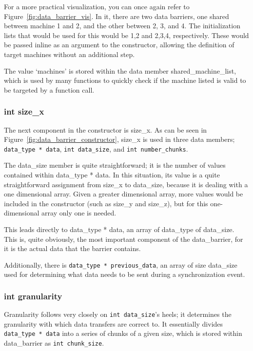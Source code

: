\documentclass[../thesis.tex]{subfiles}
\begin{document}
    For a more practical visualization, you can once again refer to Figure~\ref{fig:data_barrier_vis}. In it, there are two data barriers, one shared between machine 1 and 2, and the other between 2, 3, and 4. The initialization lists that would be used for this would be {1,2} and {2,3,4}, respectively. These would be passed inline as an argument to the constructor, allowing the definition of target machines without an additional step.

    The value `machines' is stored within the data member shared\_machine\_list, which is used by many functions to quickly check if the machine listed is valid to be targeted by a function call.

  \subsubsection{int size\_x} %
  \label{ssub:int_size_x}
      The next component in the constructor is size\_x. As can be seen in Figure~\ref{fig:data_barrier_constructor}, size\_x is used in three data members; \texttt{data\_type * data}, \texttt{int data\_size}, and \texttt{int number\_chunks}.

      The data\_size member is quite straightforward; it is the number of values contained within data\_type * data. In this situation, its value is a quite straightforward assignment from size\_x to data\_size, because it is dealing with a one dimensional array. Given a greater dimensional array, more values would be included in the constructor (such as size\_y and size\_z), but for this one-dimensional array only one is needed.

      This leads directly to data\_type * data, an array of data\_type of data\_size. This is, quite obviously, the most important component of the data\_barrier, for it is the actual data that the barrier contains.

      Additionally, there is \texttt{data\_type * previous\_data}, an array of size data\_size used for determining what data needs to be sent during a synchronization event.

  \subsubsection{int granularity} %
  \label{ssub:int_granularity}
    Granularity follows very closely on \texttt{int data\_size}'s heels; it determines the granularity with which data transfers are correct to. It essentially divides \texttt{data\_type * data} into a series of chunks of a given size, which is stored within data\_barrier as \texttt{int chunk\_size}.
\end{document}
